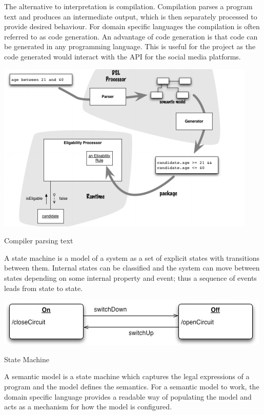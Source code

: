 \documentclass[chapterprefix=false]{scrreprt}
\begin{document}
The alternative to interpretation is compilation. Compilation parses a program text and produces an intermediate output, which is then separately processed to provide desired behaviour. For domain specific languages the compilation is often referred to as code generation. An advantage of code generation is that code can be generated in any programming language. This is useful for the project as the code generated would interact with the API for the social media platforms\cite{DBLP:books/daglib/0034522}.

\begin{center}
 \includegraphics[scale=0.7]{compiler}
 \newline
 \caption{Compiler parsing text \cite{DBLP:books/daglib/0034522}}
\end{center}

A state machine is a model of a system as a set of explicit states with transitions between them. Internal states can be classified and the system can move between states depending on some internal property and event; thus a sequence of events leads from state to state\cite{DBLP:books/daglib/0034522}.

\begin{center}
 \includegraphics[scale=0.7]{state-machine}
  \newline
  \caption{State Machine \cite{DBLP:books/daglib/0034522}}
\end{center}

A semantic model is a state machine which captures the legal expressions of a program and the model defines the semantics. For a semantic model to work, the domain specific language provides a readable way of populating the model and acts as a mechanism for how the model is configured\cite{DBLP:books/daglib/0034522}.
\end{document}
